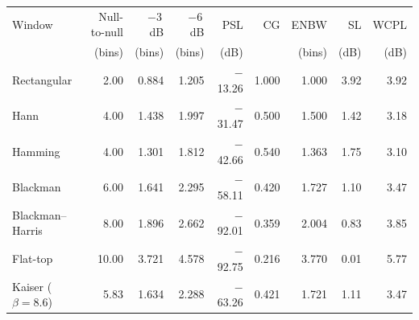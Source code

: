 \begin{tabular}{lrrrrrrrr}
\hline
Window & Null-to-null & $-3$\,dB & $-6$\,dB & PSL & CG & ENBW & SL & WCPL \\
 & (bins) & (bins) & (bins) & (dB) & & (bins) & (dB) & (dB) \\
\hline
Rectangular & 2.00 & 0.884 & 1.205 & $-$13.26 & 1.000 & 1.000 & 3.92 & 3.92 \\
Hann & 4.00 & 1.438 & 1.997 & $-$31.47 & 0.500 & 1.500 & 1.42 & 3.18 \\
Hamming & 4.00 & 1.301 & 1.812 & $-$42.66 & 0.540 & 1.363 & 1.75 & 3.10 \\
Blackman & 6.00 & 1.641 & 2.295 & $-$58.11 & 0.420 & 1.727 & 1.10 & 3.47 \\
Blackman--Harris & 8.00 & 1.896 & 2.662 & $-$92.01 & 0.359 & 2.004 & 0.83 & 3.85 \\
Flat-top & 10.00 & 3.721 & 4.578 & $-$92.75 & 0.216 & 3.770 & 0.01 & 5.77 \\
Kaiser ($\beta = 8.6$) & 5.83 & 1.634 & 2.288 & $-$63.26 & 0.421 & 1.721 & 1.11 & 3.47 \\
\hline
\end{tabular}
